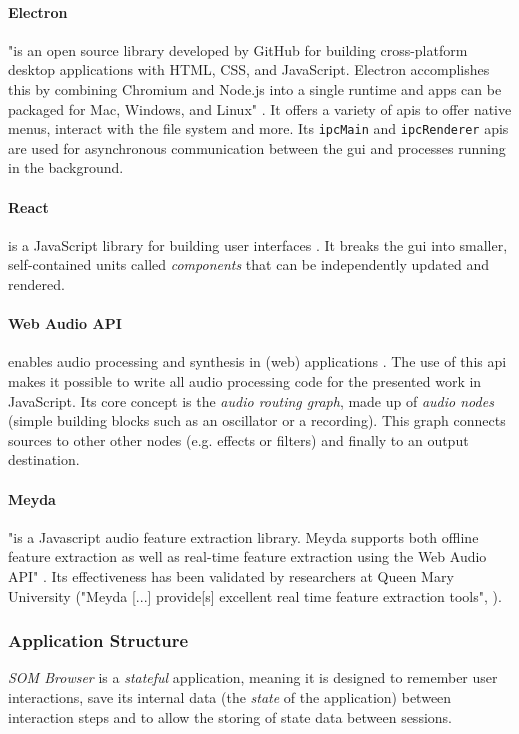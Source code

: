 \paragraph{Electron}
\label{para:electron}
"is an open source library developed by GitHub for building cross-platform
desktop applications with HTML, CSS, and JavaScript. Electron accomplishes this
by combining Chromium and Node.js into a single runtime and apps can be
packaged for Mac, Windows, and Linux" \citep{electron2019}. It offers a variety
of \glspl{api} to offer native menus, interact with the file system and more.
Its \texttt{ipcMain} and \texttt{ipcRenderer} \glspl{api} are used for
asynchronous communication between the \gls{gui} and processes running in the
background.

\paragraph{React}
\label{para:react}
is a JavaScript library for building user interfaces \citep{react2019}. It
breaks the \gls{gui} into smaller, self-contained units called
\textit{components} that can be independently updated and rendered.

\paragraph{Web Audio API}
\label{para:web_audio_api}
enables audio processing and synthesis in (web) applications
\citep{webaudio2019}. The use of this \gls{api} makes it possible to write all
audio processing code for the presented work in JavaScript. Its core concept is
the \textit{audio routing graph}, made up of \textit{audio nodes} (simple
building blocks such as an oscillator or a recording). This graph connects
sources to other other nodes (e.g. effects or filters) and finally to an output
destination.

\paragraph{Meyda}
\label{para:meyda}
"is a Javascript audio feature extraction library. Meyda supports both offline
feature extraction as well as real-time feature extraction using the Web Audio
API" \citep{web:meyda2019}. Its effectiveness has been validated by researchers
at Queen Mary University ("Meyda [...] provide[s] excellent real time feature
extraction tools", \citet{moffat2015}).

\subsubsection{Application Structure}
\label{subsubsec:som-browser_structure}
\textit{SOM Browser} is a \textit{stateful} application, meaning it is designed
to remember user interactions, save its internal data (the \textit{state} of
the application) between interaction steps and to allow the storing of state
data between sessions.

